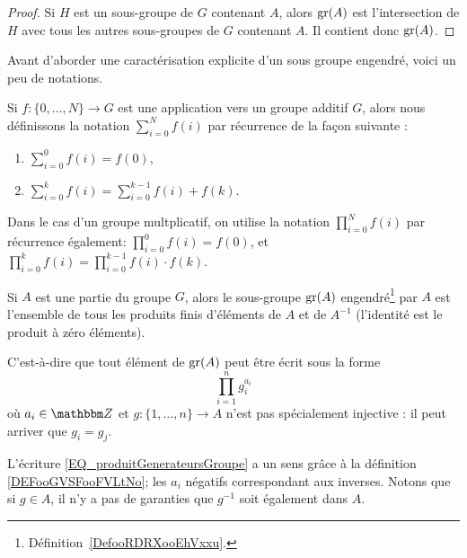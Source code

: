 \begin{proof}
    Si \( H\) est un sous-groupe de \( G\) contenant \( A\), alors \( \operatorname{gr}(A)\) est l'intersection de \( H\) avec tous les autres sous-groupes de \( G\) contenant \( A\). Il contient donc \( \operatorname{gr}(A)\).
\end{proof}

Avant d'aborder une caractérisation explicite d'un sous groupe engendré, voici un peu de notations.
\begin{definition}      \label{DEFooNEVNooJlmJOC}
    Si \( f\colon \{ 0,\ldots, N \}\to G\) est une application vers un groupe additif \( G\), alors nous définissons la notation \( \sum_{i=0}^Nf(i)\) par récurrence de la façon suivante :
    \begin{enumerate}
        \item
            \( \sum_{i=0}^0f(i)=f(0)\),
        \item
            \( \sum_{i=0}^{k}f(i)=\sum_{i=0}^{k-1}f(i)+f(k)\).
    \end{enumerate}
    Dans le cas d'un groupe multplicatif, on utilise la notation \( \prod_{i=0}^N f(i)\) par récurrence également:  \( \prod_{i=0}^0 f(i) = f(0)\), et  \( \prod_{i=0}^{k}f(i)=\prod_{i=0}^{k-1}f(i)\cdot f(k)\).
\end{definition}


\begin{lemma}   \label{LemFUIZooBZTCiy}
    Si \( A\) est une partie du groupe \( G\), alors le sous-groupe \( \operatorname{gr}(A)\) engendré\footnote{Définition~\ref{DefooRDRXooEhVxxu}.} par \( A\) est l'ensemble de tous les produits finis d'éléments de \( A\) et de \( A^{-1}\) (l'identité est le produit à zéro éléments).

    C'est-à-dire que tout élément de \( \operatorname{gr}(A)\) peut être écrit sous la forme
    \begin{equation}\label{EQ_produitGenerateursGroupe}
        \prod_{i=1}^ng_i^{a_i}
    \end{equation}
    où \( a_i\in \eZ\) et \( g\colon\{ 1,\ldots, n \}\to A\) n'est pas spécialement injective : il peut arriver que \( g_i=g_j\).
\end{lemma}
L'écriture \eqref{EQ_produitGenerateursGroupe} a un sens grâce à la définition \ref{DEFooGVSFooFVLtNo}; les \( a_i\) négatifs correspondant aux inverses. Notons que si \( g\in A\), il n'y a pas de garanties que \( g^{-1}\) soit également dans \( A\).

